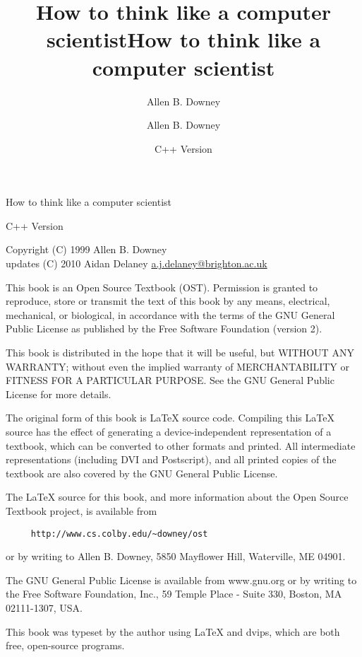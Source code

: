 \documentclass{book}
\title{How to think like a computer scientist}
\author{Allen B. Downey}
\date{}
\begin{document}
\title {How to think like a computer scientist}
\author {Allen B. Downey}
\date {C++ Version}
\maketitle

\vspace{2in}
\begin{center}
{\Large How to think like a computer scientist}

C++ Version
\vspace{0.25in}

Copyright (C) 1999  Allen B. Downey\\
updates (C) 2010 Aidan Delaney \url{a.j.delaney@brighton.ac.uk}
\end{center}
\vspace{0.25in}

This book is an Open Source Textbook (OST).  Permission is
granted to reproduce, store or transmit the text of this
book by any means, electrical, mechanical, or biological,
in accordance with the terms of the GNU General Public License as
published by the Free Software Foundation (version 2).

This book is distributed in the hope that it will be useful,
but WITHOUT ANY WARRANTY; without even the implied warranty of
MERCHANTABILITY or FITNESS FOR A PARTICULAR PURPOSE.  See the GNU
General Public License for more details.

The original form of this book is LaTeX source code.
Compiling this LaTeX source has the effect of generating
a device-independent representation of a textbook, which
can be converted to other formats and printed.  All intermediate
representations (including DVI and Postscript), and all printed
copies of the textbook are also covered by the GNU General
Public License.

The LaTeX source for this book, and more information about
the Open Source Textbook project, is available from

\begin{verbatim}
     http://www.cs.colby.edu/~downey/ost
\end{verbatim}
%
or by writing to Allen B. Downey, 5850 Mayflower Hill,
Waterville, ME 04901.

The GNU General Public License is available from
www.gnu.org or by writing to the Free Software Foundation,
Inc., 59 Temple Place - Suite 330, Boston, MA 02111-1307, USA.

This book was typeset by the author using LaTeX and dvips,
which are both free, open-source programs.


\frontmatter
\tableofcontents

\mainmatter
















\appendix


\printindex
\end{document}
